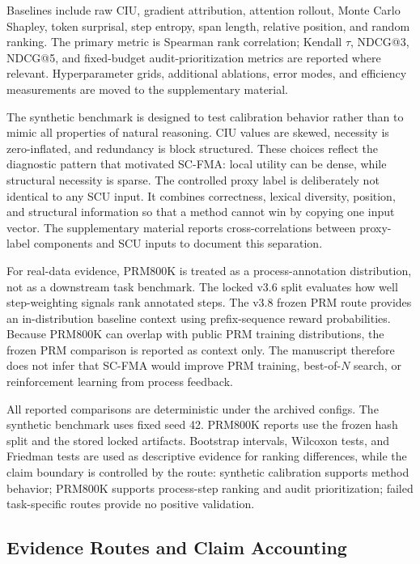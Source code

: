 \documentclass[a4paper,fleqn]{cas-sc}
\begin{document}
Baselines include raw CIU, gradient attribution, attention rollout, Monte Carlo Shapley, token surprisal, step entropy, span length, relative position, and random ranking. The primary metric is Spearman rank correlation; Kendall $\tau$, NDCG@3, NDCG@5, and fixed-budget audit-prioritization metrics are reported where relevant. Hyperparameter grids, additional ablations, error modes, and efficiency measurements are moved to the supplementary material.

The synthetic benchmark is designed to test calibration behavior rather than to mimic all properties of natural reasoning. CIU values are skewed, necessity is zero-inflated, and redundancy is block structured. These choices reflect the diagnostic pattern that motivated SC-FMA: local utility can be dense, while structural necessity is sparse. The controlled proxy label is deliberately not identical to any SCU input. It combines correctness, lexical diversity, position, and structural information so that a method cannot win by copying one input vector. The supplementary material reports cross-correlations between proxy-label components and SCU inputs to document this separation.

For real-data evidence, PRM800K is treated as a process-annotation distribution, not as a downstream task benchmark. The locked v3.6 split evaluates how well step-weighting signals rank annotated steps. The v3.8 frozen PRM route provides an in-distribution baseline context using prefix-sequence reward probabilities. Because PRM800K can overlap with public PRM training distributions, the frozen PRM comparison is reported as context only. The manuscript therefore does not infer that SC-FMA would improve PRM training, best-of-$N$ search, or reinforcement learning from process feedback.

All reported comparisons are deterministic under the archived configs. The synthetic benchmark uses fixed seed 42. PRM800K reports use the frozen hash split and the stored locked artifacts. Bootstrap intervals, Wilcoxon tests, and Friedman tests are used as descriptive evidence for ranking differences, while the claim boundary is controlled by the route: synthetic calibration supports method behavior; PRM800K supports process-step ranking and audit prioritization; failed task-specific routes provide no positive validation.

\subsection{Evidence Routes and Claim Accounting}
\end{document}
